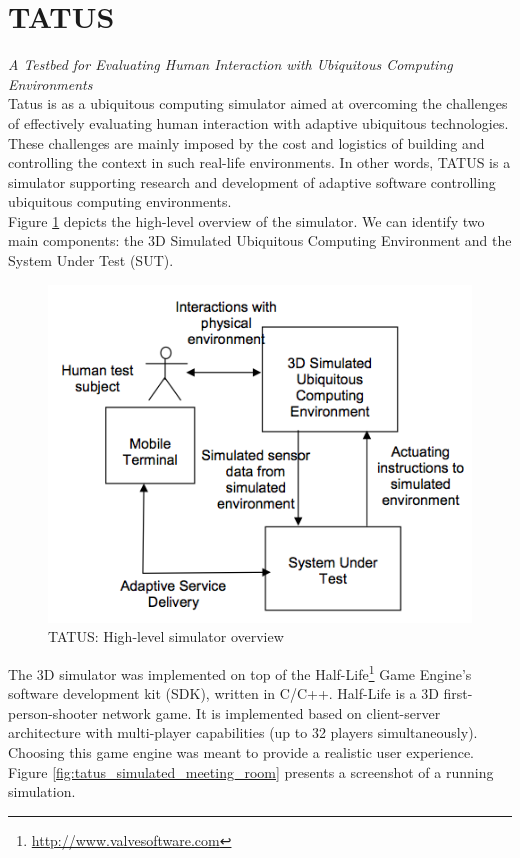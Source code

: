 \section{TATUS}\label{sec:tatus}
\emph{A Testbed for Evaluating Human Interaction with Ubiquitous Computing Environments}\\

Tatus \cite{o2005testbed} is as a ubiquitous computing simulator aimed at overcoming the challenges of effectively evaluating human interaction with adaptive ubiquitous technologies. These challenges are mainly imposed by the cost and logistics of building and controlling the context in such real-life environments. In other words, TATUS is a simulator supporting research and development of adaptive software controlling ubiquitous computing environments.\\

Figure \ref{fig:tatus_overview} depicts the high-level overview of the simulator. We can identify two main components: the 3D Simulated Ubiquitous Computing Environment and the System Under Test (SUT).\\

\begin{figure}[H]
	\centering
	\includegraphics[width=\linewidth]{gfx/Chapter2/tatus_system_overview}
	\caption{TATUS: High-level simulator overview}
	\label{fig:tatus_overview}
\end{figure}

The 3D simulator was implemented on top of the Half-Life\footnote{\url{http://www.valvesoftware.com}} Game Engine's software development kit (SDK), written in C/C++. Half-Life is a 3D first-person-shooter network game. It is implemented based on client-server architecture with multi-player capabilities (up to 32 players simultaneously). Choosing this game engine was meant to provide a realistic user experience. Figure \ref{fig:tatus_simulated_meeting_room} presents a screenshot of a running simulation.\\

